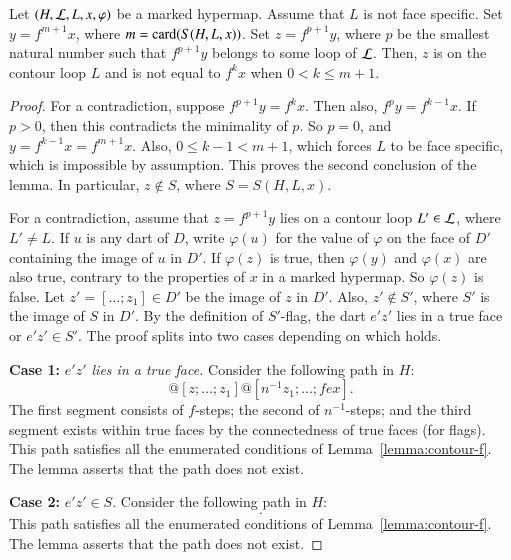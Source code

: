 \begin{lemma} \label{lemma:yz}
Let $(H,{\cal L},L,x,\varphi)$ be a marked hypermap.
Assume that  $L$ is not face specific.
Set  $y = f^{m+1} x$, where $m = {\operatorname{card}}(S(H,L,x))$.
  Set
$z=f^{p+1} y$, where $p$ be the smallest natural number 
such that $f^{p+1} y$ belongs to some loop of ${\cal L}$.
Then, $z$ is on the contour loop $L$ and is not
equal to $f^k x$ when $0 < k \le {m+1}$.
\end{lemma}

\begin{proof} 
  For a contradiction, suppose $f^{p+1} y = f^k x$. Then also, $f^p y
  = f^{k-1} x$.  If $p>0$, then this contradicts the minimality of
  $p$.  So $p=0$, and $y=f^{k-1} x = f^{m+1} x$.  Also, $0\le k-1 <
  {m+1}$, which forces  $L$ to be face specific, which is
  impossible by assumption.  This proves the second conclusion of the
  lemma.  In particular, $z\not\in S$, where $S = S(H,L,x)$.

For a contradiction, assume that $z = f^{p+1} y$ lies on a
contour loop $L'\in {\cal L}$, where $L'\ne L$.  
If $u$ is any dart of $D$, write $\varphi(u)$ for the value
of $\varphi$ on the face of $D'$ containing the image of $u$ in $D'$.
If $\varphi(z)$ is true, then $\varphi(y)$
and $\varphi(x)$ are also true, contrary to the properties of $x$
in a marked hypermap.
So $\varphi(z)$ is false.  Let $z' = [\ldots;z_1]\in D'$ be the
image of $z$ in $D'$.  
Also, $z'\not\in S'$, where  $S'$ is the image of $S$ in $D'$.  By the definition of
$S'$-flag, the dart $e'z'$ lies in a true face or $e'z'\in S'$.  The
proof splits into two cases depending on which holds.

{\bf Case 1:} {\it $e'z'$ lies in a true face.}  Consider the following
path in $H$:
\begin{displaymath}
[y;fy;\ldots;z] @ [z;\ldots;z_1] @ [n^{-1} z_1;\ldots;f e x].
\end{displaymath}
The first segment consists of $f$-steps; the second of $n^{-1}$-steps;
and the third segment exists within true faces by the connectedness of
true faces (for flags).  This path satisfies all the enumerated
conditions of Lemma~\ref{lemma:contour-f}.  The lemma asserts that the
path does not exist.

{\bf Case 2:} { $e'z'\in S$.}   Consider the following path in $H$:
\begin{displaymath}
[y;f y;\ldots;z].
\end{displaymath}
This path satisfies all the enumerated conditions of
Lemma~\ref{lemma:contour-f}.  The lemma asserts that the path does not
exist.
\end{proof}


